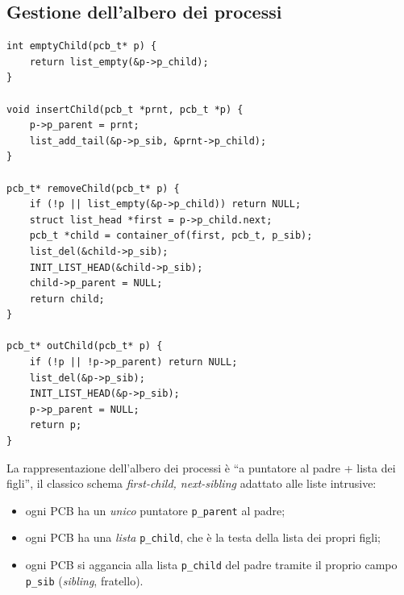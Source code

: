\documentclass[11pt,a4paper]{article}
\newcommand{\code}[1]{\texttt{#1}}
\begin{document}
\subsection{Gestione dell'albero dei processi}
\begin{lstlisting}
int emptyChild(pcb_t* p) {
    return list_empty(&p->p_child);
}

void insertChild(pcb_t *prnt, pcb_t *p) {
    p->p_parent = prnt;
    list_add_tail(&p->p_sib, &prnt->p_child);
}

pcb_t* removeChild(pcb_t* p) {
    if (!p || list_empty(&p->p_child)) return NULL;
    struct list_head *first = p->p_child.next;
    pcb_t *child = container_of(first, pcb_t, p_sib);
    list_del(&child->p_sib);
    INIT_LIST_HEAD(&child->p_sib);
    child->p_parent = NULL;
    return child;
}

pcb_t* outChild(pcb_t* p) {
    if (!p || !p->p_parent) return NULL;
    list_del(&p->p_sib);
    INIT_LIST_HEAD(&p->p_sib);
    p->p_parent = NULL;
    return p;
}
\end{lstlisting}

La rappresentazione dell'albero dei processi è ``a puntatore al padre + lista
dei figli'', il classico schema \emph{first-child, next-sibling} adattato
alle liste intrusive:
\begin{itemize}
\item ogni PCB ha un \emph{unico} puntatore \code{p\_parent} al padre;
\item ogni PCB ha una \emph{lista} \code{p\_child}, che è la testa della
  lista dei propri figli;
\item ogni PCB si aggancia alla lista \code{p\_child} del padre tramite il
  proprio campo \code{p\_sib} (\emph{sibling}, fratello).
\end{itemize}
\end{document}

